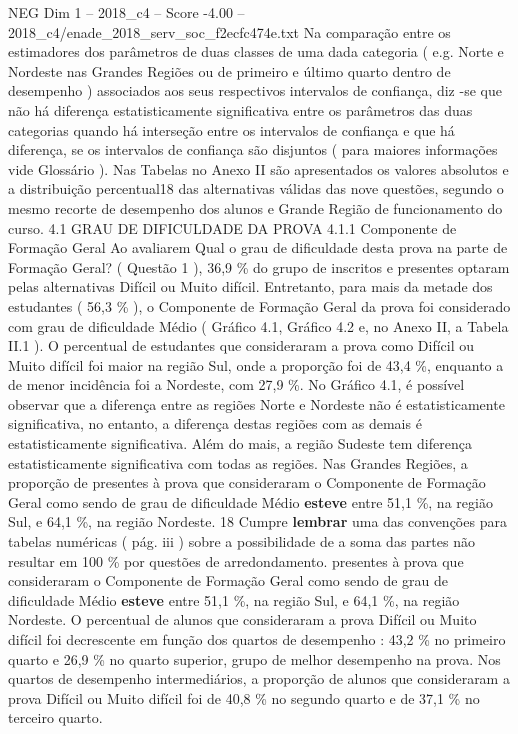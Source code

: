 \begin{textsample}{NEG Dim 1 – 2018\_c4 – Score -4.00 – 2018\_c4/enade\_2018\_serv\_soc\_f2ecfc474e.txt}
Na comparação entre os estimadores dos parâmetros de duas classes de uma dada categoria ( e.g.
Norte e Nordeste nas Grandes Regiões ou de primeiro e último quarto dentro de desempenho ) associados aos seus respectivos intervalos de confiança, diz -se que não há diferença estatisticamente significativa entre os parâmetros das duas categorias quando há interseção entre os intervalos de confiança e que há diferença, se os intervalos de confiança são disjuntos ( para maiores informações vide Glossário ).
Nas Tabelas no Anexo II são apresentados os valores absolutos e a distribuição percentual18 das alternativas válidas das nove questões, segundo o mesmo recorte de desempenho dos alunos e Grande Região de funcionamento do curso. 4.1 GRAU DE DIFICULDADE DA PROVA 4.1.1 Componente de Formação Geral Ao avaliarem Qual o grau de dificuldade desta prova na parte de Formação Geral? ( Questão 1 ), 36,9 \% do grupo de inscritos e presentes optaram pelas alternativas Difícil ou Muito difícil.
Entretanto, para mais da metade dos estudantes ( 56,3 \% ), o Componente de Formação Geral da prova foi considerado com grau de dificuldade Médio ( Gráfico 4.1, Gráfico 4.2 e, no Anexo II, a Tabela II.1 ).
O percentual de estudantes que consideraram a prova como Difícil ou Muito difícil foi maior na região Sul, onde a proporção foi de 43,4 \%, enquanto a de menor incidência foi a Nordeste, com 27,9 \%.
No Gráfico 4.1, é possível observar que a diferença entre as regiões Norte e Nordeste não é estatisticamente significativa, no entanto, a diferença destas regiões com as demais é estatisticamente significativa.
Além do mais, a região Sudeste tem diferença estatisticamente significativa com todas as regiões.
Nas Grandes Regiões, a proporção de presentes à prova que consideraram o Componente de Formação Geral como sendo de grau de dificuldade Médio \textbf{esteve} entre 51,1 \%, na região Sul, e 64,1 \%, na região Nordeste. 18 Cumpre \textbf{lembrar} uma das convenções para tabelas numéricas ( pág. iii ) sobre a possibilidade de a soma das partes não resultar em 100 \% por questões de arredondamento. presentes à prova que consideraram o Componente de Formação Geral como sendo de grau de dificuldade Médio \textbf{esteve} entre 51,1 \%, na região Sul, e 64,1 \%, na região Nordeste.
O percentual de alunos que consideraram a prova Difícil ou Muito difícil foi decrescente em função dos quartos de desempenho : 43,2 \% no primeiro quarto e 26,9 \% no quarto superior, grupo de melhor desempenho na prova.
Nos quartos de desempenho intermediários, a proporção de alunos que consideraram a prova Difícil ou Muito difícil foi de 40,8 \% no segundo quarto e de 37,1 \% no terceiro quarto.

\end{textsample}
